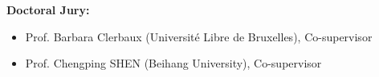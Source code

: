 \afterpage{\blankpage}
\thispagestyle{empty}
\begin{Large}
\textbf{Doctoral Jury:}
\end{Large}
\begin{itemize}
\item{Prof. Barbara Clerbaux (Universit\'e Libre de Bruxelles), Co-supervisor}
\item{Prof. Chengping SHEN (Beihang University), Co-supervisor}

\end{itemize}


\newpage
{}
